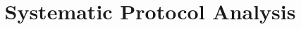 \documentclass[10pt,twocolumn,letterpaper,inchmargins]{sig-alt-hotnets}
\begin{document}
\title{Systematic Protocol Analysis}
\author{}
\date{}
\maketitle

\begin{abstract}

\end{abstract}








\begin{footnotesize}


\end{footnotesize}
\end{document}
